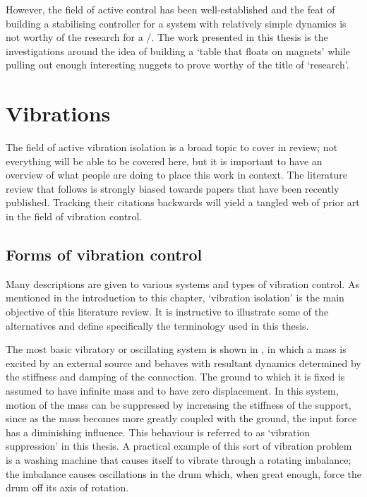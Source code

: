 However, the field of active control has been well-established and the feat of building a stabilising controller for a system with relatively simple dynamics is not worthy of the research for a \PhD/.
The work presented in this thesis is the investigations around the idea of building a `table that floats on magnets' while pulling out enough interesting nuggets to prove worthy of the title of `research'.



\section{Vibrations}

The field of active vibration isolation is a broad topic to cover in review; not everything will be able to be covered here, but it is important to have an overview of what people are doing to place this work in context.
The literature review that follows is strongly biased towards papers that have been recently published.
Tracking their citations backwards will yield a tangled web of prior art in the field of vibration control.

\subsection{Forms of vibration control}

Many descriptions are given to various systems and types of vibration control.
As mentioned in the introduction to this chapter, `vibration isolation' is the main objective of this literature review.
It is instructive to illustrate some of the alternatives and define specifically the terminology used in this thesis.

The most basic vibratory or oscillating system is shown in , in which a mass is excited by an external source and behaves with resultant dynamics determined by the stiffness and damping of the connection.
The ground to which it is fixed is assumed to have infinite mass and to have zero displacement.
In this system, motion of the mass can be suppressed by increasing the stiffness of the support, since as the mass becomes more greatly coupled with the ground, the input force has a diminishing influence.
This behaviour is referred to as `vibration suppression' in this thesis.
A practical example of this sort of vibration problem is a washing machine that causes itself to vibrate through a rotating imbalance; the imbalance causes oscillations in the drum which, when great enough, force the drum off its axis of rotation.

